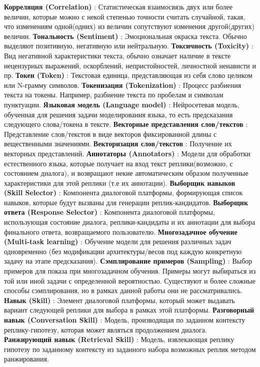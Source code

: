 \textbf{Корреляция (Correlation)} : Статистическая взаимосвязь двух или более величин, которые можно с некой степенью точности считать случайной, такая, что изменениям одной(одних) из величин сопутствуют изменения другой(других) величин.
\textbf{Тональность (Sentiment)} : Эмоциональная окраска текста. Обычно выделяют позитивную, негативную или нейтральную.
\textbf{Токсичность (Toxicity)} : Вид негативной характеристики текста, обычно означает наличие в тексте нецензурных выражений, оскорблений, непристойностей, личностной ненависти и пр.
\textbf{Токен (Token)} : Текстовая единица, представляющая из себя слово целиком или N-грамму символов.
\textbf{Токенизация (Tokenization)} : Процесс разбиения текста на токены. Например, разбиение текста по пробелам и символам пунктуации.
\textbf{Языковая модель (Language model)} : Нейросетевая модель, обученная для решения задачи моделирования языка, то есть предсказания следующего слова/токена в тексте.
\textbf{Векторные представления слов/текстов} : Представление слов/текстов в виде векторов фиксированной длины с вещественными значениями.
\textbf{Векторизация слов/текстов} : Получение их векторных представлений. 
\textbf{Аннотаторы (Annotators)} : Модели для обработки естественного языка, которые получает на вход текст реплики(возможно, с состоянием диалога), и возвращают некие автоматическим образом полученные характеристики для этой реплики (т.е их аннотации). 
\textbf{Выборщик навыков (Skill Selector)} : Компонента диалоговой платформы, формирующая список навыков, которые будут вызваны для генерации реплик-кандидатов.
\textbf{Выборщик ответа (Response Selector)} : Компонента диалоговой платформы, использующая состояние диалога, реплики-кандидаты и их аннотации для выбора финального ответа, возвращаемого пользователю.
\textbf{Многозадачное обучение (Multi-task learning)} : Обучение модели для решения различных задач одновременно (без модификации архитектуры/весов под каждую конкретную задачу на этапе предсказания).
\textbf{Сэмплирование примеров (Sampling)} : Выбор примеров для показа при многозадачном обучения. Примеры могут выбираться из той или иной задачи с определенной вероятностью. Существуют и более сложные способы сэмплирования, но в рамках данной работы они не рассматривались.
\textbf{Навык (Skill)} : Элемент диалоговой платформы, который может выдавать вариант следующей реплики для выбора в рамках этой платформы. 
\textbf{Разговорный навык (Conversation Skill)} : Модель, производящая по заданном контексту реплику-гипотезу, которая может являться продолжением диалога.
\textbf{Ранжирующий навык (Retrieval Skill)} : Модель, извлекающая реплику гипотезу по заданному контексту из заданного набора возможных реплик методом ранжирования.
